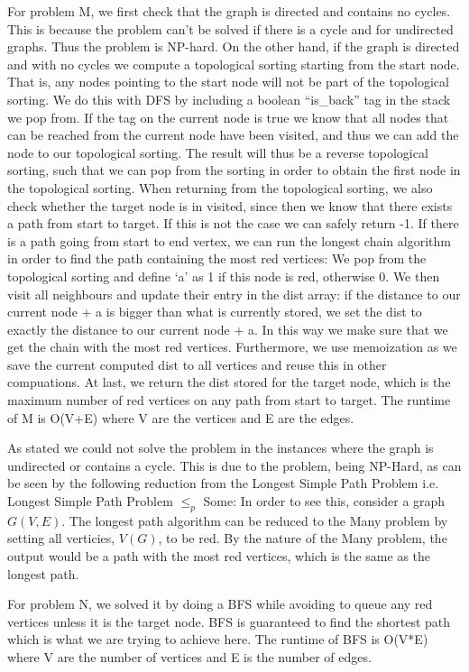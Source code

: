 \documentclass{tufte-handout}
\begin{document}
For problem M, we first check that the graph is directed and contains no cycles. This is because the problem can’t be solved if there is a cycle and for undirected graphs. Thus the problem is NP-hard. On the other hand, if the graph is directed and with no cycles we compute a topological sorting starting from the start node. That is, any nodes pointing to the start node will not
 be part of the topological sorting. We do this with DFS by including a boolean “is\_back” tag in the stack we pop from. If the tag on the current node is true we know that all nodes that can be reached from the current node have been visited, and thus we can add the node to our topological sorting. The result will thus be a reverse topological sorting, 
such that we can pop from the sorting in order to obtain the first node in the topological sorting. When returning from the topological sorting, we also check whether the target node is in visited, since then we know that there exists a path from start to target. If this is not the case we can safely return
 -1. If there is a path going from start to end vertex, we can run the longest chain algorithm in order to find the path containing the most red vertices: We pop from the topological sorting and define ‘a’ as 1 if this node is red, otherwise 0. We then visit all neighbours and update their entry in the dist array: if the distance to our current node + a is bigger
 than what is currently stored, we set the dist to exactly the distance to our current node + a. In this way we make sure that we get the chain with the most red vertices. Furthermore, we use memoization as we save the current computed dist to all vertices and reuse this in other compuations. At last, we return the dist stored for the target node, which is the maximum number of red vertices on any path from start to target. The runtime of M is O(V+E) where V are the vertices and E are the edges.
 
As stated we could not solve the problem in the instances where the graph is undirected or contains a cycle. This is due to the problem, being NP-Hard, as can be seen by the following reduction from the Longest Simple Path Problem i.e. Longest Simple Path Problem $\leq_p$ Some: In order to see this, consider a graph $G(V,E)$. The longest path algorithm can be reduced to the Many problem by setting all verticies, $V(G)$, to be red. By the nature of the Many problem, the output would be a path with the most red vertices, which is the same as the longest path. 

For problem N, we solved it by doing a BFS while avoiding to queue any red vertices unless it is the target node. BFS is guaranteed
to find the shortest path which is what we are trying to achieve here.
The runtime of BFS is O(V*E) where V are the number of vertices and E is the number of edges.
\end{document}

